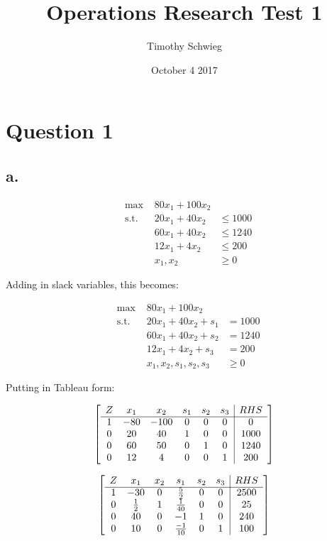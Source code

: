 \documentclass[10pt, letterpaper]{paper}
\title{ Operations Research Test 1 }
\author{ Timothy Schwieg }
\date{ October 4 2017 }
\begin{document}
\maketitle

\section*{Question 1 }
\subsection*{a.}

\begin{equation*}
\begin{alignedat}{3}
&\text{max }&80x_1 + 100x_2&\\
&\text{s.t. } &20x_1 + 40x_2  &\leq 1000\\
& &60x_1 + 40x_2  &\leq 1240\\
& &12x_1 + 4x_2 &\leq 200\\
& &x_1, x_2 &\geq 0
\end{alignedat}
\end{equation*}

Adding in slack variables, this becomes:

\begin{equation*}
\begin{alignedat}{3}
&\text{max }&80x_1 + 100x_2&\\
&\text{s.t. } &20x_1 + 40x_2 + s_1  &= 1000\\
& &60x_1 + 40x_2 + s_2 &= 1240\\
& &12x_1 + 4x_2 + s_3 &= 200\\
& &x_1, x_2, s_1, s_2, s_3 &\geq 0
\end{alignedat}
\end{equation*}

Putting in Tableau form:

\[
	\left[ {\begin{array}{cccccc|c}
	Z & x_1 & x_2 & s_1 & s_2 & s_3 & RHS\\ \cline{1-7}
	1 & -80 & -100& 0 & 0 & 0 & 0 \\
	0 & 20 & 40 & 1 & 0 & 0 &1000\\
	0 & 60 & 50 & 0& 1 & 0 & 1240\\
	0 & 12 & 4 & 0 & 0 & 1 & 200 \\
	\end{array} } \right]
\]

\[
	\left[ {\begin{array}{cccccc|c}
	Z & x_1 & x_2 & s_1 & s_2 & s_3 & RHS\\ \cline{1-7}
	1 & -30 & 0 & \frac{5}{2} & 0 & 0 & 2500 \\
	0 & \frac{1}{2} & 1 & \frac{1}{40} & 0 & 0 &25\\
	0 & 40 & 0 & -1 & 1 & 0 & 240\\
	0 & 10 & 0 & \frac{-1}{10} & 0 & 1 & 100 \\
	\end{array} } \right]
\]
\end{document}
